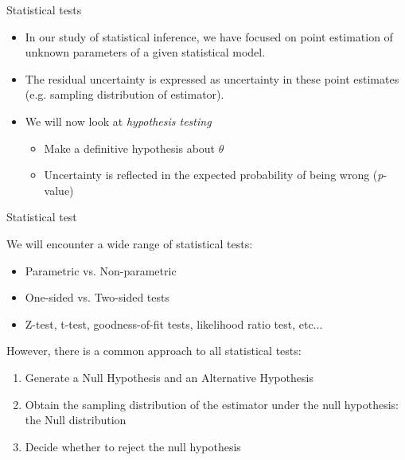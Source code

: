 \documentclass{beamer}
\begin{document}
\begin{frame}{Statistical tests}

	\begin{itemize}
		\item In our study of statistical inference, we have focused on point estimation
	of unknown parameters of a given statistical model.
		\item  The residual uncertainty is expressed as uncertainty in these point
	estimates (e.g. sampling distribution of estimator).
		\item We will now look at \textit{hypothesis testing}
		\begin{itemize}
 			\item Make a definitive hypothesis about $\theta$
			\item Uncertainty is reflected in the expected probability of being wrong (\textit{p}-value)
		\end{itemize}
	\end{itemize}

\end{frame}

\begin{frame}{Statistical test}

	We will encounter a wide range of statistical tests:
	\begin{itemize}
		\item Parametric vs. Non-parametric
		\item One-sided vs. Two-sided tests
		\item Z-test, t-test, goodness-of-fit tests, likelihood ratio test, etc...
	\end{itemize}

	\pause

	However, there is a common approach to all statistical tests:
	\begin{enumerate}	
		\item Generate a Null Hypothesis and an Alternative Hypothesis
		\item Obtain the sampling distribution of the estimator under the null
		hypothesis: the Null distribution
		\item Decide whether to reject the null hypothesis
	\end{enumerate}

\end{frame}
\end{document}
